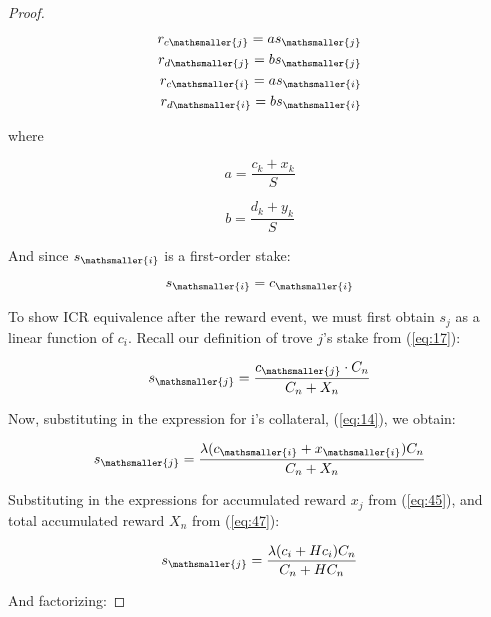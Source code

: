 \documentclass[reqno]{article}
\begin{document}
\begin{proof}
\begin{equation} \label{eq:20}
    \begin{split}
        r_{c\mathsmaller{j}}=as_\mathsmaller{j}\\
        r_{d\mathsmaller{j}}=bs_\mathsmaller{j}\\
        r_{c\mathsmaller{i}}=as_\mathsmaller{i}\\
        r_{d\mathsmaller{i}}=bs_\mathsmaller{i}
    \end{split}
\end{equation}

\bigskip
where

\begin{equation} \label{eq:20_a}
    a=\frac{c_k+x_k}{S}
\end{equation}

\begin{equation} \label{eq:20_b}
    b=\frac{d_k+y_k}{S}
\end{equation}

\bigskip
And since $s_\mathsmaller{i}$ is a first-order stake:

\begin{equation} \label{eq:21}
    s_\mathsmaller{i}=c_\mathsmaller{i}
\end{equation}

\bigskip
To show ICR equivalence after the reward event, we must first obtain $s_j$ as a linear function of $c_i$. Recall our definition of trove $j$’s stake from (\ref{eq:17}):

\begin{equation} 
    s_\mathsmaller{j}=\frac{c_\mathsmaller{j} \cdot C_n}{C_n+X_n}
\end{equation}

\bigskip
Now, substituting in the expression for i’s collateral, (\ref{eq:14}), we obtain:

\begin{equation} 
    s_\mathsmaller{j}=\frac{\lambda(c_\mathsmaller{i}+x_\mathsmaller{i})C_n}{C_n+X_n}
\end{equation}


\bigskip
Substituting in the expressions for accumulated reward $x_j$ from (\ref{eq:45}), and total accumulated reward $X_n$ from (\ref{eq:47}):

\begin{equation} 
    s_\mathsmaller{j}=\frac{\lambda(c_i+Hc_i)C_n}{C_n+HC_n}
\end{equation}

\bigskip
And factorizing:


\end{proof}
\end{document}
